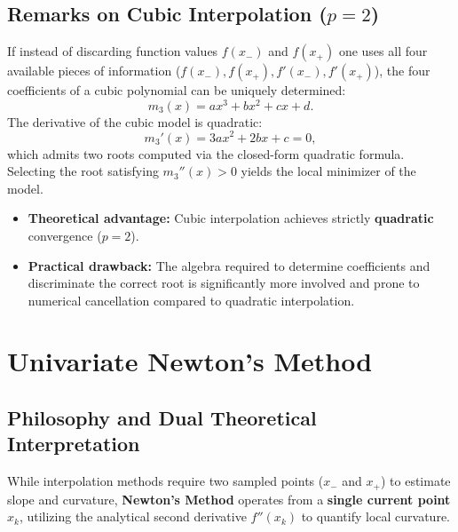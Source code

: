 \subsection{Remarks on Cubic Interpolation ($p = 2$)}
If instead of discarding function values $f(x_-)$ and $f(x_+)$ one uses all four available pieces of information ($f(x_-), f(x_+), f'(x_-), f'(x_+)$), the four coefficients of a cubic polynomial can be uniquely determined:
\begin{equation}
    m_3(x) = a x^3 + b x^2 + c x + d.
\end{equation}
The derivative of the cubic model is quadratic:
\begin{equation}
    m_3'(x) = 3 a x^2 + 2 b x + c = 0,
\end{equation}
which admits two roots computed via the closed-form quadratic formula. Selecting the root satisfying $m_3''(x) > 0$ yields the local minimizer of the model.
\begin{itemize}
    \item \textbf{Theoretical advantage:} Cubic interpolation achieves strictly \textbf{quadratic} convergence ($p = 2$).
    \item \textbf{Practical drawback:} The algebra required to determine coefficients and discriminate the correct root is significantly more involved and prone to numerical cancellation compared to quadratic interpolation.
\end{itemize}

\FloatBarrier
\section{Univariate Newton's Method}
\label{sec:univariate-newton-method-en}

\subsection{Philosophy and Dual Theoretical Interpretation}
While interpolation methods require two sampled points ($x_-$ and $x_+$) to estimate slope and curvature, \textbf{Newton's Method} operates from a \textbf{single current point} $x_k$, utilizing the analytical second derivative $f''(x_k)$ to quantify local curvature.

